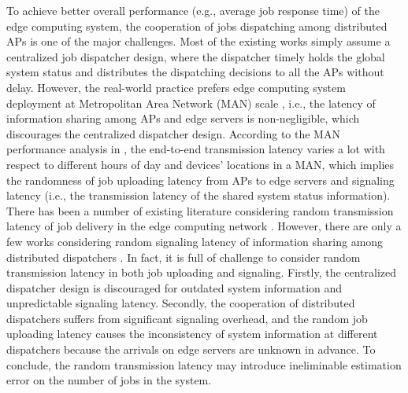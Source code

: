 To achieve better overall performance (e.g., average job response time) of the edge computing system, the cooperation of jobs dispatching among distributed APs is one of the major challenges.
Most of the existing works simply assume a centralized job dispatcher design, where the dispatcher timely holds the global system status and distributes the dispatching decisions to all the APs without delay.
However, the real-world practice prefers edge computing system deployment at Metropolitan Area Network (MAN) scale , i.e., the latency of information sharing among APs and edge servers is non-negligible, which discourages the centralized dispatcher design.
According to the MAN performance analysis in \cite{MAN-LATENCY}, the end-to-end transmission latency varies a lot with respect to different hours of day and devices' locations in a MAN, which implies the randomness of job uploading latency from APs to edge servers and signaling latency (i.e., the transmission latency of the shared {system status} information).
There has been a number of existing literature considering random transmission latency of job delivery in the edge computing network \cite{latency-EDGE19,MOBIHOC19-ZhouZ,IOTJ18-FanQ,TOC19-LiuC,JSAC19-AlameddineHA}.
However, there are only a few works considering random signaling latency of information sharing among distributed dispatchers \cite{tan-online,TWC18-LyuX}.
In fact, it is full of challenge to consider random transmission latency in both job uploading and signaling.
Firstly, the centralized dispatcher design is discouraged for outdated system information and unpredictable signaling latency.
Secondly, the cooperation of distributed dispatchers suffers from significant signaling overhead, and the random job uploading latency causes the inconsistency of system information at different dispatchers because the arrivals on edge servers are unknown in advance.
To conclude, the random transmission latency may introduce ineliminable estimation error on the number of jobs in the system.


